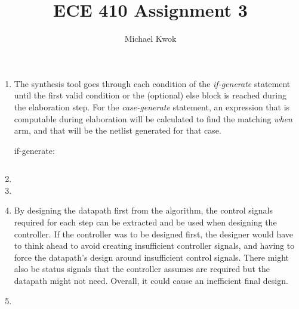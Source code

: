 \documentclass{article}
\title{ECE 410 Assignment 3}
\author{Michael Kwok}
\begin{document}
\maketitle
\begin{enumerate}
    \item The synthesis tool goes through each condition of the \textit{if-generate} statement until the first valid condition or the (optional) else block is reached during the elaboration step. For the \textit{case-generate} statement, an expression that is computable during elaboration will be calculated to find the matching \textit{when} arm, and that will be the netlist generated for that case.

          if-generate:
          \begin{verbatim}

  \end{verbatim}

    \item

    \item

    \item By designing the datapath first from the algorithm, the control signals required for each step can be extracted and be used when designing the controller. If the controller was to be designed first, the designer would have to think ahead to avoid creating insufficient controller signals, and having to force the datapath's design around insufficient control signals. There might also be status signals that the controller assumes are required but the datapath might not need. Overall, it could cause an inefficient final design.

    \item


\end{enumerate}
\end{document}
